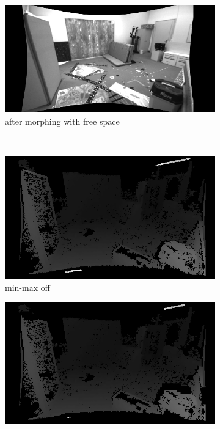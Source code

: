 \documentclass[12pt,titlepage, a4paper]{article}
\begin{document}
\begin{figure}[h!]
	\centering
	\begin{subfigure}[h]{0.45\textwidth}
		\includegraphics[width=\textwidth]{./jumpEdge/camera.png}
		\caption{after morphing with free space}
	\end{subfigure}\\
	\begin{subfigure}[h]{0.45\textwidth}
		\includegraphics[width=\textwidth]{./jumpEdge/je_off_disparity.png}
		\caption{min-max off}
	\end{subfigure}
	\begin{subfigure}[h]{0.45\textwidth}
		\includegraphics[width=\textwidth]{./jumpEdge/je_on_disparity.png}

\end{subfigure}
\end{figure}
\end{document}
